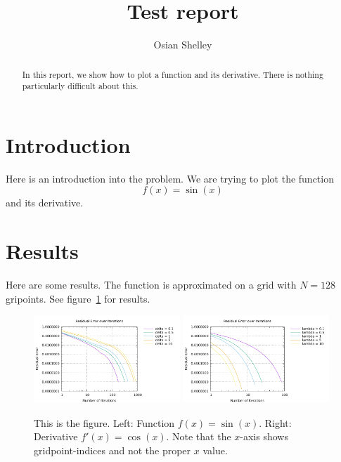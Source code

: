 \documentclass[10pt]{article}
\begin{document}
\title{Test report}
\author{Osian Shelley}


\maketitle
\begin{abstract}
  In this report, we show how to plot a function and its
  derivative. There is nothing particularly difficult about this.
\end{abstract}

\section{Introduction}

Here is an introduction into the problem. We are trying to plot the function
\begin{equation}
  f(x) = \sin(x)
\end{equation}
and its derivative.

\section{Results}

Here are some results. The function is approximated on a grid with
$N=128$ gripoints. See figure~\ref{fig:func_and_deriv} for results.
 \begin{figure}%
 \begin{center}
    \includegraphics[width=0.49\textwidth]{function}
    \includegraphics[width=0.49\textwidth]{function2}
  \end{center}
  \caption{This is the figure. Left: Function $f(x)=\sin(x)$. Right:
    Derivative $f'(x) = \cos(x)$. Note that the $x$-axis shows
    gridpoint-indices and not the proper $x$ value.
  \label{fig:func_and_deriv}}
\end{figure}
\end{document}
